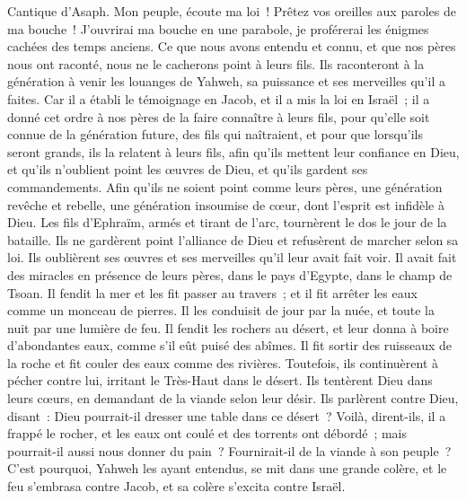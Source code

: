 \begin{multicols}{2}
\VerseOne{}Cantique d'Asaph. Mon peuple, écoute ma loi~! Prêtez vos oreilles aux paroles de ma bouche~!
J'ouvrirai ma bouche en une parabole, je proférerai les énigmes cachées des temps anciens.
Ce que nous avons entendu et connu, et que nos pères nous ont raconté,
nous ne le cacherons point à leurs fils. Ils raconteront à la génération à venir les louanges de Yahweh, sa puissance et ses merveilles qu'il a faites.
Car il a établi le témoignage en Jacob, et il a mis la loi en Israël~; il a donné cet ordre à nos pères de la faire connaître à leurs fils,
pour qu'elle soit connue de la génération future, des fils qui naîtraient, et pour que lorsqu'ils seront grands, ils la relatent à leurs fils,
afin qu'ils mettent leur confiance en Dieu, et qu'ils n'oublient point les œuvres de Dieu, et qu'ils gardent ses commandements.
Afin qu'ils ne soient point comme leurs pères, une génération revêche et rebelle, une génération insoumise de cœur, dont l'esprit est infidèle à Dieu.
Les fils d'Ephraïm, armés et tirant de l'arc, tournèrent le dos le jour de la bataille.
Ils ne gardèrent point l'alliance de Dieu et refusèrent de marcher selon sa loi.
Ils oublièrent ses œuvres et ses merveilles qu'il leur avait fait voir.
Il avait fait des miracles en présence de leurs pères, dans le pays d'Egypte, dans le champ de Tsoan.
Il fendit la mer et les fit passer au travers~; et il fit arrêter les eaux comme un monceau de pierres.
Il les conduisit de jour par la nuée, et toute la nuit par une lumière de feu.
Il fendit les rochers au désert, et leur donna à boire d'abondantes eaux, comme s'il eût puisé des abîmes.
Il fit sortir des ruisseaux de la roche et fit couler des eaux comme des rivières.
Toutefois, ils continuèrent à pécher contre lui, irritant le Très-Haut dans le désert.
Ils tentèrent Dieu dans leurs cœurs, en demandant de la viande selon leur désir.
Ils parlèrent contre Dieu, disant~: Dieu pourrait-il dresser une table dans ce désert~?
Voilà, dirent-ils, il a frappé le rocher, et les eaux ont coulé et des torrents ont débordé~; mais pourrait-il aussi nous donner du pain~? Fournirait-il de la viande à son peuple~?
C'est pourquoi, Yahweh les ayant entendus, se mit dans une grande colère, et le feu s'embrasa contre Jacob, et sa colère s'excita contre Israël.

\end{multicols}
